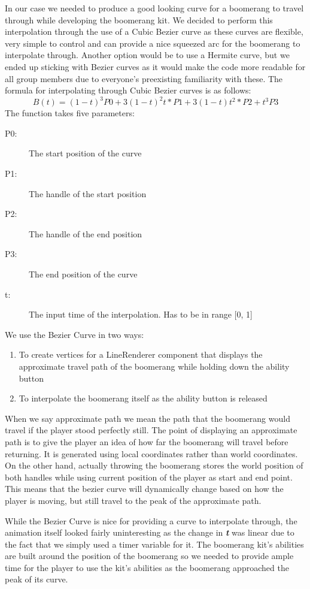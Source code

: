 In our case we needed to produce a good looking curve for a boomerang to travel through while developing the boomerang kit. We decided to perform this interpolation through the use of a Cubic Bezier curve as these curves are flexible, very simple to control and can provide a nice squeezed arc for the boomerang to interpolate through. Another option would be to use a Hermite curve, but we ended up sticking with Bezier curves as it would make the code more readable for all group members due to everyone's preexisting familiarity with these. The formula for interpolating through Cubic Bezier curves is as follows:  
$$
B(t) = (1 - t)^3 P0 + 3(1 - t)^2 t * P1 + 3(1 - t)t^2 * P2 + t^3 P3 
$$
The function takes five parameters:
\begin{description}
    \item[P0:] The start position of the curve
    \item[P1:] The handle of the start position
    \item[P2:] The handle of the end position
    \item[P3:] The end position of the curve
    \item[t:]  The input time of the interpolation. Has to be in range [0, 1]
\end{description}

We use the Bezier Curve in two ways:
\begin{enumerate}
    \item To create vertices for a LineRenderer component that displays the approximate travel path of the boomerang while holding down the ability button
    \item To interpolate the boomerang itself as the ability button is released
\end{enumerate}
When we say approximate path we mean the path that the boomerang would travel if the player stood perfectly still.
The point of displaying an approximate path is to give the player an idea of how far the boomerang will travel before returning. It is generated using local coordinates rather than world coordinates. On the other hand, actually throwing the boomerang stores the world position of both handles while using current position of the player as start and end point. This means that the bezier curve will dynamically change based on how the player is moving, but still travel to the peak of the approximate path.  

While the Bezier Curve is nice for providing a curve to interpolate through, the animation itself looked fairly uninteresting as the change in \textbf{\textit{t}} was linear due to the fact that we simply used a timer variable for it. The boomerang kit's abilities are built around the position of the boomerang so we needed to provide ample time for the player to use the kit's abilities as the boomerang approached the peak of its curve. 

